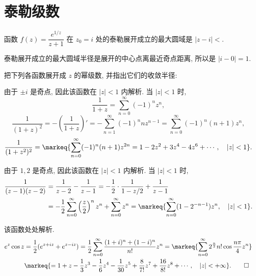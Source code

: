 \section{泰勒级数}


\begin{exercise}
	函数 $f(z)=\dfrac{e^{1/z}}{z+1}$ 在 $z_0=i$ 处的泰勒展开成立的最大圆域是 $|z-i|<$.
\end{exercise}
\begin{solution}[解析]
	泰勒展开成立的最大圆域半径是展开的中心点离最近奇点距离, 所以是 $|i-0|=1$.
\end{solution}


\begin{exercise}[3]
	把下列各函数展开成 $z$ 的幂级数, 并指出它们的收敛半径:
\end{exercise}
\begin{solution}
	\subex 由于 $\pm i$ 是奇点, 因此该函数在 $|z|<1$ 内解析.
	当 $|z|<1$ 时,
	\[\frac1{1+z}=\sum_{n=0}^\infty(-1)^nz^n,\]
	\[\frac1{(1+z)^2}=-\left(\frac1{1+z}\right)'
	=-\sum_{n=1}^\infty(-1)^nnz^{n-1}
	=\sum_{n=0}^\infty(-1)^n(n+1)z^n,\]
	\[\frac1{(1+z^2)^2}=\markeq{\sum_{n=0}^\infty(-1)^n(n+1)z^{2n}
	=1-2z^2+3z^4-4z^6+\cdots,\quad |z|<1}.\]

	\subex 由于 $1,2$ 是奇点, 因此该函数在 $|z|<1$ 内解析.
	当 $|z|<1$ 时,
	\begin{align*}
		\frac1{(z-1)(z-2)}&=\frac1{z-2}-\frac1{z-1}
		=-\frac12\cdot\frac1{1-z/2}+\frac1{z-1}\\
		&=-\frac12\sum_{n=0}^\infty\left(\frac z2\right)^nz^n
		+\sum_{n=0}^\infty z^n
		=\markeq{\sum_{n=0}^\infty (1-2^{-n-1})z^n,\quad |z|<1}.
	\end{align*}

	\subex 该函数处处解析.
	\begin{align*}
		e^z\cos z&=\frac12(e^{z+iz}+e^{z-iz})=\frac12\sum_{n=0}^\infty\frac{(1+i)^n+(1-i)^n}{n!}z^n=\markeq{\sum_{n=0}^\infty2^{\frac n2}{n!}\cos\frac{n\pi}4z^n}\\
		&\markeq{=1+z-\frac13z^3-\frac16z^4-\frac1{30}z^5+\frac{8}{7!}z^7+\frac{16}{8!}z^8+\cdots,\quad |z|<+\infty}.\qedhere
	\end{align*}
\end{solution}


